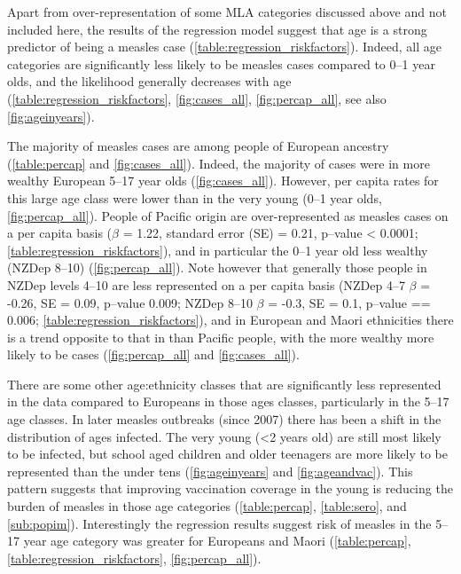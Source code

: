 \documentclass{article}
\begin{document}
Apart from over-representation of some MLA categories discussed above and not included here, the results of the regression model suggest that age is a strong predictor of being a measles case (\autoref{table:regression_riskfactors}). Indeed, all age categories are significantly less likely to be measles cases compared to 0--1 year olds, and the likelihood generally decreases with age (\autoref{table:regression_riskfactors}, \autoref{fig:cases_all}, \autoref{fig:percap_all}, see also \autoref{fig:ageinyears}).

The majority of measles cases are among people of European ancestry (\autoref{table:percap} and \autoref{fig:cases_all}). Indeed, the majority of cases were in more wealthy European 5--17 year olds (\autoref{fig:cases_all}). However, per capita rates for this large age class were lower than in the very young (0--1 year olds, \autoref{fig:percap_all}). People of Pacific origin are over-represented as measles cases on a per capita basis ($\beta$ = 1.22, standard error (SE) = 0.21, p--value < 0.0001; \autoref{table:regression_riskfactors}), and in particular the 0--1 year old less wealthy (NZDep 8--10) (\autoref{fig:percap_all}). Note however that generally those people in NZDep levels 4--10 are less represented on a per capita basis (NZDep 4--7 $\beta$ = -0.26, SE = 0.09, p--value 0.009; NZDep 8--10 $\beta$ = -0.3, SE = 0.1, p--value == 0.006; \autoref{table:regression_riskfactors}), and in European and Maori ethnicities there is a trend opposite to that in than Pacific people, with the more wealthy more likely to be cases (\autoref{fig:percap_all} and \autoref{fig:cases_all}).

There are some other age:ethnicity classes that are significantly less represented in the data compared to Europeans in those ages classes, particularly in the 5--17 age classes. In later measles outbreaks (since 2007) there has been a shift in the distribution of ages infected. The very young (<2 years old) are still most likely to be infected, but school aged children and older teenagers are more likely to be represented than the under tens (\autoref{fig:ageinyears} and \autoref{fig:ageandvac}). This pattern suggests that improving vaccination coverage in the young is reducing the burden of measles in those age categories (\autoref{table:percap}, \autoref{table:sero}, and \autoref{sub:popim}). Interestingly the regression results suggest risk of measles in the 5--17 year age category was greater for Europeans and Maori (\autoref{table:percap}, \autoref{table:regression_riskfactors}, \autoref{fig:percap_all}).
\end{document}
